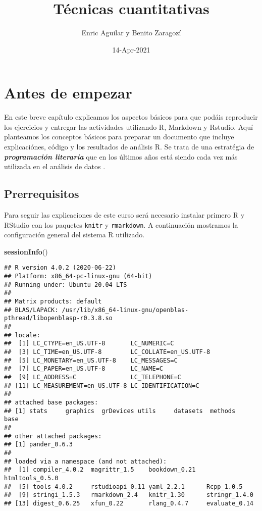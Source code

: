 \documentclass[
]{book}
\title{Técnicas cuantitativas}
\author{Enric Aguilar y Benito Zaragozí}
\date{14-Apr-2021}
\newenvironment{Shaded}{\begin{snugshade}}{\end{snugshade}}
\newcommand{\KeywordTok}[1]{\textcolor[rgb]{0.13,0.29,0.53}{\textbf{#1}}}
\newcommand{\NormalTok}[1]{#1}
\begin{document}
\maketitle

{
\setcounter{tocdepth}{1}
\tableofcontents
}
\hypertarget{antes-de-empezar}{%
\chapter*{Antes de empezar}\label{antes-de-empezar}}

En este breve capítulo explicamos los aspectos básicos para que podáis reproducir los ejercicios y entregar las actividades utilizando R, Markdown y Rstudio. Aquí planteamos los conceptos básicos para preparar un documento que incluye explicaciónes, código y los resultados de análisis R. Se trata de una estratégia de \textbf{\emph{programación literaria}} que en los últimos años está siendo cada vez más utilizada en el análisis de datos \citep{knuth1984literate, xie2015knitr}.

\hypertarget{prerrequisitos}{%
\section{Prerrequisitos}\label{prerrequisitos}}

Para seguir las explicaciones de este curso será necesario instalar primero R y RStudio con los paquetes \texttt{knitr} y \texttt{rmarkdown}. A continuación mostramos la configuración general del sistema R utilizado.

\begin{Shaded}
\begin{Highlighting}[]
\KeywordTok{sessionInfo}\NormalTok{()}
\end{Highlighting}
\end{Shaded}

\begin{verbatim}
## R version 4.0.2 (2020-06-22)
## Platform: x86_64-pc-linux-gnu (64-bit)
## Running under: Ubuntu 20.04 LTS
## 
## Matrix products: default
## BLAS/LAPACK: /usr/lib/x86_64-linux-gnu/openblas-pthread/libopenblasp-r0.3.8.so
## 
## locale:
##  [1] LC_CTYPE=en_US.UTF-8       LC_NUMERIC=C              
##  [3] LC_TIME=en_US.UTF-8        LC_COLLATE=en_US.UTF-8    
##  [5] LC_MONETARY=en_US.UTF-8    LC_MESSAGES=C             
##  [7] LC_PAPER=en_US.UTF-8       LC_NAME=C                 
##  [9] LC_ADDRESS=C               LC_TELEPHONE=C            
## [11] LC_MEASUREMENT=en_US.UTF-8 LC_IDENTIFICATION=C       
## 
## attached base packages:
## [1] stats     graphics  grDevices utils     datasets  methods   base     
## 
## other attached packages:
## [1] pander_0.6.3
## 
## loaded via a namespace (and not attached):
##  [1] compiler_4.0.2  magrittr_1.5    bookdown_0.21   htmltools_0.5.0
##  [5] tools_4.0.2     rstudioapi_0.11 yaml_2.2.1      Rcpp_1.0.5     
##  [9] stringi_1.5.3   rmarkdown_2.4   knitr_1.30      stringr_1.4.0  
## [13] digest_0.6.25   xfun_0.22       rlang_0.4.7     evaluate_0.14
\end{verbatim}
\end{document}
